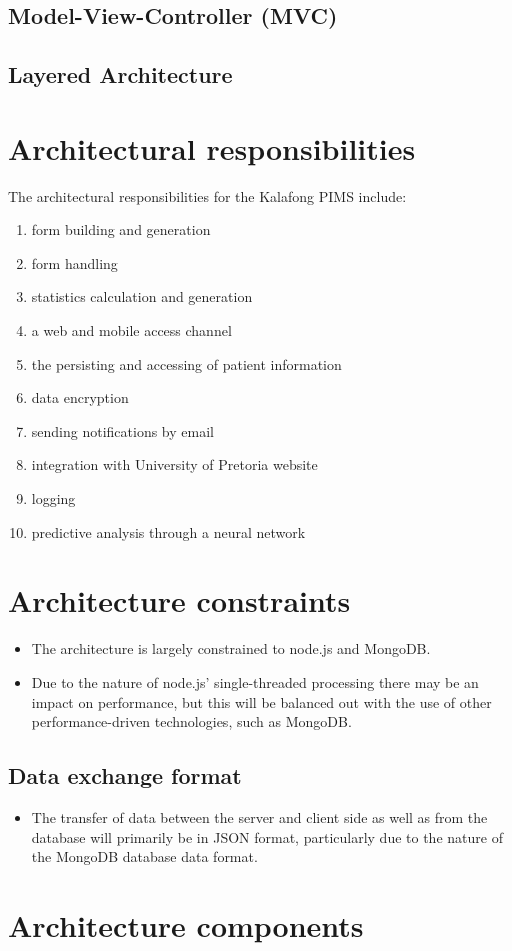 \documentclass[a4paper,12pt,titlepage]{article}
\begin{document}
\subsection{Model-View-Controller (MVC)}
	
	
\subsection{Layered Architecture}
	

\newpage	
\section{Architectural responsibilities}
The architectural responsibilities for the Kalafong PIMS include:
\begin{enumerate}
	\item form building and generation
	\item form handling
	\item statistics calculation and generation
	\item a web and mobile access channel
	\item the persisting and accessing of patient information
	\item data encryption
	\item sending notifications by email
	\item integration with University of Pretoria website
	\item logging
	\item predictive analysis through a neural network
\end{enumerate}


\newpage
\section{Architecture constraints}
\begin{itemize}
	\item The architecture is largely constrained to node.js and MongoDB.
	\item Due to the nature of node.js' single-threaded processing there may be an impact on performance, but this will be balanced out with the use of other performance-driven technologies, such as MongoDB.
\end{itemize}

\subsection{Data exchange format}
\begin{itemize}
	\item The transfer of data between the server and client side as well as from the database will primarily be in JSON format, particularly due to the nature of the MongoDB database data format.
\end{itemize}

\newpage
\section{Architecture components}

\end{document}
